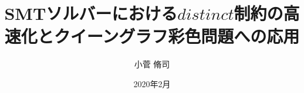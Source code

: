 \documentclass[a4paper,12pt]{jbook}
\title{SMTソルバーにおける$distinct$制約の高速化とクイーングラフ彩色問題への応用}
\date{2020年2月}
\author{小菅 脩司}
\begin{document}
\maketitle


\tableofcontents    %
\listoffigures      %
\listoftables       %
\lstlistoflistings  %









\end{document}

